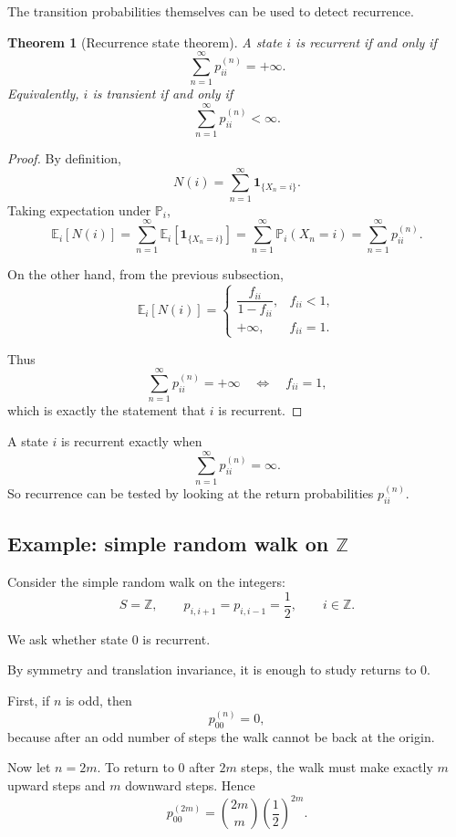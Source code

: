 \documentclass[11pt]{article}
\newtheorem{theorem}{Theorem}[section]
\theoremstyle{definition}
\begin{document}
The transition probabilities themselves can be used to detect recurrence.

\begin{theorem}[Recurrence state theorem]
A state \(i\) is recurrent if and only if
\[
\sum_{n=1}^{\infty} p_{ii}^{(n)}=+\infty.
\]
Equivalently, \(i\) is transient if and only if
\[
\sum_{n=1}^{\infty} p_{ii}^{(n)}<\infty.
\]
\end{theorem}

\begin{proof}
By definition,
\[
N(i)=\sum_{n=1}^{\infty}\mathbf 1_{\{X_n=i\}}.
\]
Taking expectation under \(\mathbb P_i\),
\[
\mathbb E_i[N(i)]
=
\sum_{n=1}^{\infty}\mathbb E_i[\mathbf 1_{\{X_n=i\}}]
=
\sum_{n=1}^{\infty}\mathbb P_i(X_n=i)
=
\sum_{n=1}^{\infty} p_{ii}^{(n)}.
\]

On the other hand, from the previous subsection,
\[
\mathbb E_i[N(i)]
=
\begin{cases}
\dfrac{f_{ii}}{1-f_{ii}}, & f_{ii}<1,\\[1em]
+\infty, & f_{ii}=1.
\end{cases}
\]

Thus
\[
\sum_{n=1}^{\infty} p_{ii}^{(n)}=+\infty
\quad \Longleftrightarrow \quad
f_{ii}=1,
\]
which is exactly the statement that \(i\) is recurrent.
\end{proof}

\begin{keyformula}
A state \(i\) is recurrent exactly when
\[
\sum_{n=1}^{\infty} p_{ii}^{(n)}=\infty.
\]
So recurrence can be tested by looking at the return probabilities \(p_{ii}^{(n)}\).
\end{keyformula}

\subsection{Example: simple random walk on \texorpdfstring{$\mathbb Z$}{Z}}

Consider the simple random walk on the integers:
\[
S=\mathbb Z,
\qquad
p_{i,i+1}=p_{i,i-1}=\frac12,
\qquad i\in\mathbb Z.
\]

We ask whether state \(0\) is recurrent.

By symmetry and translation invariance, it is enough to study returns to \(0\).

First, if \(n\) is odd, then
\[
p_{00}^{(n)}=0,
\]
because after an odd number of steps the walk cannot be back at the origin.

Now let \(n=2m\). To return to \(0\) after \(2m\) steps, the walk must make exactly \(m\) upward steps and \(m\) downward steps. Hence
\[
p_{00}^{(2m)}
=
\binom{2m}{m}\left(\frac12\right)^{2m}.
\]
\end{document}
